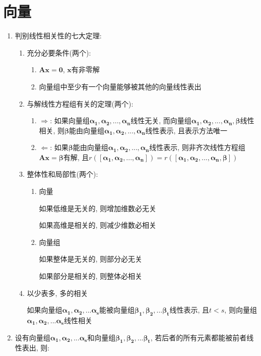 \chapter{向量}
\begin{enumerate}
\item 判别线性相关性的七大定理:
\begin{enumerate}
\item 充分必要条件(两个):
\begin{enumerate}
\item $\bm{A}\bm{x}=\bm{0}$, $\bm{x}$有非零解
\item 向量组中至少有一个向量能够被其他的向量线性表出
\end{enumerate}
\item 与解线性方程组有关的定理(两个):
\begin{enumerate}
\item $\Rightarrow$: 如果向量组$\bm{{\alpha_{1}}},\bm{{\alpha_{2}}},...,\bm{{\alpha_{n}}}$线性无关, 而向量组$\bm{{\alpha_{1}}},\bm{{\alpha_{2}}},...,\bm{{\alpha_{n}},\bm{\beta}}$线性相关, 则$\bm{\beta}$能由向量组$\bm{{\alpha_{1}}},\bm{{\alpha_{2}}},...,\bm{{\alpha_{n}}}$线性表示, 且表示方法唯一
\item $\Leftarrow$: 如果$\bm{\beta}$能由向量组$\bm{{\alpha_{1}}},\bm{{\alpha_{2}}},...,\bm{{\alpha_{n}}}$线性表示, 则非齐次线性方程组$\bm{A}\bm{x}=\bm{\beta}$有解, 且$r([\bm{{\alpha_{1}}},\bm{{\alpha_{2}}},...,\bm{{\alpha_{n}}}])=r([\bm{{\alpha_{1}}},\bm{{\alpha_{2}}},...,\bm{{\alpha_{n}}},\bm{\beta}])$
\end{enumerate}
\item 整体性和局部性(两个):
\begin{enumerate}
\item 向量 \par
如果低维是无关的, 则增加维数必无关\par
如果高维是相关的, 则减少维数必相关
\item 向量组 \par
如果整体是无关的, 则部分必无关 \par
如果部分是相关的, 则整体必相关
\end{enumerate}
\item 以少表多, 多的相关 \par
如果向量组$\bm{\alpha_{1}},\bm{\alpha_{2}},...\bm{\alpha_{s}}$能被向量组$\bm{\beta_{1}},\bm{\beta_{2}},...\bm{\beta_{t}}$线性表示, 且$t<s$, 则向量组$\bm{\alpha_{1}},\bm{\alpha_{2}},...\bm{\alpha_{s}}$线性相关
\end{enumerate}
\item 设有向量组$\bm{\alpha_{1}},\bm{\alpha_{2}},...\bm{\alpha_{s}}$和向量组$\bm{\beta_{1}},\bm{\beta_{2}},...\bm{\beta_{t}}$, 若后者的所有元素都能被前者线性表出, 则:

\end{enumerate}
